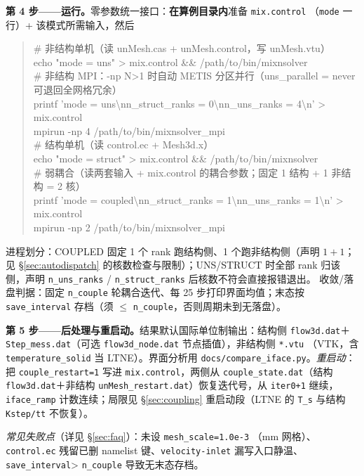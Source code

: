 \documentclass[11pt,a4paper]{ctexart}
\begin{document}
\textbf{第 4 步——运行。}零参数统一接口：\textbf{在算例目录内}准备 \texttt{mix.control}
（\texttt{mode} 一行）+ 该模式所需输入，然后
\begin{quote}\ttfamily\small
\# 非结构单机（读 unMesh.cas + unMesh.control，写 unMesh.vtu）\\
echo "mode = uns" > mix.control \&\& /path/to/bin/mixnsolver\\
\medskip
\# 非结构 MPI：-np N>1 时自动 METIS 分区并行（uns\_parallel = never 可退回全网格冗余）\\
printf 'mode = uns\textbackslash nn\_struct\_ranks = 0\textbackslash nn\_uns\_ranks = 4\textbackslash n' > mix.control\\
mpirun -np 4 /path/to/bin/mixnsolver\_mpi\\
\medskip
\# 结构单机（读 control.ec + Mesh3d.x）\\
echo "mode = struct" > mix.control \&\& /path/to/bin/mixnsolver\\
\medskip
\# 弱耦合（读两套输入 + mix.control 的耦合参数；固定 1 结构 + 1 非结构 = 2 核）\\
printf 'mode = coupled\textbackslash nn\_struct\_ranks = 1\textbackslash nn\_uns\_ranks = 1\textbackslash n' > mix.control\\
mpirun -np 2 /path/to/bin/mixnsolver\_mpi
\end{quote}
进程划分：COUPLED 固定 1 个 rank 跑结构侧、1 个跑非结构侧（声明 $1+1$；见
\S\ref{sec:autodispatch} 的核数检查与限制）；UNS/STRUCT 时全部 rank 归该侧，声明
\texttt{n\_uns\_ranks} / \texttt{n\_struct\_ranks} 后核数不符会直接报错退出。
收敛/落盘判据：固定 \texttt{n\_couple} 轮耦合迭代、每 25 步打印界面均值；末态按
\texttt{save\_interval} 存档（须 $\le$ \texttt{n\_couple}，否则周期未到无落盘）。

\textbf{第 5 步——后处理与重启动。}结果默认国际单位制输出：结构侧 \texttt{flow3d.dat}＋
\texttt{Step\_mess.dat}（可选 \texttt{flow3d\_node.dat} 节点插值），非结构侧 \texttt{*.vtu}
（VTK，含 \texttt{temperature\_solid} 当 LTNE）。界面分析用
\texttt{docs/compare\_iface.py}。\emph{重启动}：把 \texttt{couple\_restart=1} 写进
\texttt{mix.control}，两侧从 \texttt{couple\_state.dat}（结构 \texttt{flow3d.dat}＋非结构
\texttt{unMesh\_restart.dat}）恢复迭代号，从 \texttt{iter0+1} 继续，\texttt{iface\_ramp}
计数连续；局限见 \S\ref{sec:coupling} 重启动段（LTNE 的 \texttt{T\_s} 与结构
\texttt{Kstep/tt} 不恢复）。

\noindent\emph{常见失败点}（详见 \S\ref{sec:faq}）：未设 \texttt{mesh\_scale=1.0e-3}
（mm 网格）、\texttt{control.ec} 残留已删 namelist 键、\texttt{velocity-inlet} 漏写入口静温、
\texttt{save\_interval}> \texttt{n\_couple} 导致无末态存档。
\end{document}
